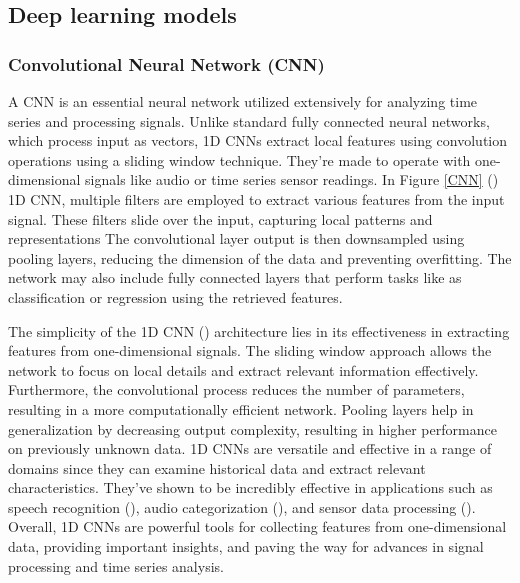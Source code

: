 \documentclass[a4paper,fleqn]{cas-sc}
\begin{document}
\subsection{Deep learning models}
\subsubsection{Convolutional Neural Network (CNN)}
A CNN is an essential neural network utilized extensively for analyzing time series and processing signals. Unlike standard fully connected neural networks, which process input as vectors, 1D CNNs extract local features using convolution operations using a sliding window technique. They're made to operate with one-dimensional signals like audio or time series sensor readings. In Figure \ref{CNN} (\cite{chaerun2021comparative}) 1D CNN, multiple filters are employed to extract various features from the input signal. These filters slide over the input, capturing local patterns and representations The convolutional layer output is then downsampled using pooling layers, reducing the dimension of the data and preventing overfitting. The network may also include fully connected layers that perform tasks like as classification or regression using the retrieved features.

The simplicity of the 1D CNN (\cite{kiranyaz20211d}) architecture lies in its effectiveness in extracting features from one-dimensional signals. The sliding window approach allows the network to focus on local details and extract relevant information effectively. Furthermore, the convolutional process reduces the number of parameters, resulting in a more computationally efficient network. Pooling layers help in generalization by decreasing output complexity, resulting in higher performance on previously unknown data. 1D CNNs are versatile and effective in a range of domains since they can examine historical data and extract relevant characteristics. They've shown to be incredibly effective in applications such as speech recognition (\cite{rusnac2022cnn,wang2019end}), audio categorization (\cite{ashraf2022role,hu2020device}), and sensor data processing (\cite{kattenborn2021review,sun2019classification}). Overall, 1D CNNs are powerful tools for collecting features from one-dimensional data, providing important insights, and paving the way for advances in signal processing and time series analysis.
\end{document}

